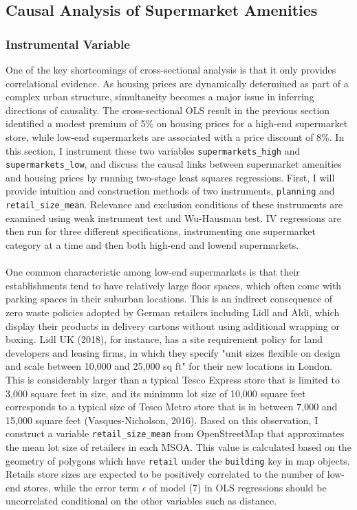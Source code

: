 \documentclass{article}
\begin{document}
\subsection{Causal Analysis of Supermarket Amenities}
\subsubsection{Instrumental Variable}
One of the key shortcomings of cross-sectional analysis is that it only provides correlational evidence. As housing prices are dynamically determined as part of a complex urban structure, simultaneity becomes a major issue in inferring directions of causality. The cross-sectional OLS result in the previous section identified a modest premium of 5\% on housing prices for a high-end supermarket store, while low-end supermarkets are associated with a price discount of 8\%. In this section, I instrument these two variables \texttt{supermarkets\_high} and \texttt{supermarkets\_low}, and discuss the causal links between supermarket amenities and housing prices by running two-stage least squares regressions. First, I will provide intuition and construction methods of two instruments, \texttt{planning} and \texttt{retail\_size\_mean}. Relevance and exclusion conditions of these instruments are examined using weak instrument test and Wu-Hausman test. IV regressions are then run for three different specifications, instrumenting one supermarket category at a time and then both high-end and lowend supermarkets.\\\\
One common characteristic among low-end supermarkets is that their establishments tend to have relatively large floor spaces, which often come with parking spaces in their suburban locations. This is an indirect consequence of zero waste policies adopted by German retailers including Lidl and Aldi, which display their products in delivery cartons without using additional wrapping or boxing. Lidl UK (2018), for instance, has a site requirement policy for land developers and leasing firms, in which they specify "unit sizes flexible on design and scale between 10,000 and 25,000 sq ft" for their new locations in London. This is considerably larger than a typical Tesco Express store that is limited to 3,000 square feet in size, and its minimum lot size of 10,000 square feet corresponds to a typical size of Tesco Metro store that is in between 7,000 and 15,000 square feet (Vasques-Nicholson, 2016). Based on this observation, I construct a variable \texttt{retail\_size\_mean} from OpenStreetMap that approximates the mean lot size of retailers in each MSOA. This value is calculated based on the geometry of polygons which have \texttt{retail} under the \texttt{building} key in map objects. Retails store sizes are expected to be positively correlated to the number of low-end stores, while the error term $\epsilon$ of model (7) in OLS regressions should be uncorrelated conditional on the other variables such as distance.
\end{document}
